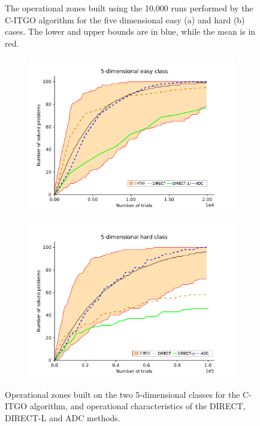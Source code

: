 \begin{figure}[h]
\begin{subfigure}{.5\textwidth}
      \caption{}
      \label{fig:OpZone_b}
    \end{subfigure}
    \caption{The operational zones built using the 10,000 runs performed by the C-ITGO algorithm for the five dimensional easy (a) and hard (b) cases. The lower and upper bounds are in blue, while the mean is in red.}\label{fig:OpZone}
\end{figure}


\begin{figure}[h]
    \centering
    \begin{subfigure}{.5\textwidth}
      \centering
      \includegraphics[width=1.1\linewidth]{Imgs/fill_5E_edit}
      \caption{}
      \label{fig:OpCarac_a}
    \end{subfigure}%
    \begin{subfigure}{.5\textwidth}
      \centering
      \includegraphics[width=1.1\linewidth]{Imgs/fill_5H_edit}
      \caption{}
      \label{fig:OpCarac_b}
    \end{subfigure}
    \caption{Operational zones built on the two 5-dimensional classes for the C-ITGO algorithm, and operational characteristics of the DIRECT, DIRECT-L and ADC methods.}\label{fig:OpCarac}
\end{figure}


